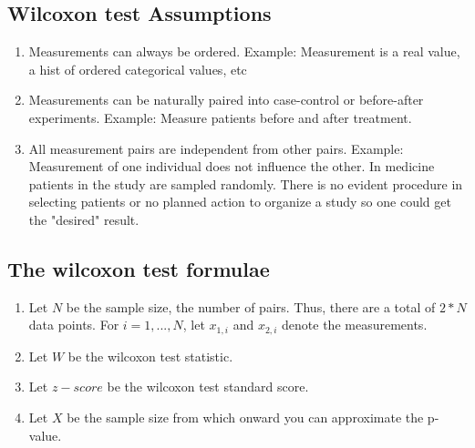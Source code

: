 \documentclass[12pt]{article}
\begin{document}
\subsection{Wilcoxon test Assumptions}

\begin{enumerate}
  \item Measurements can always be ordered. Example: Measurement is a real value, a hist of ordered categorical values, etc
  \item Measurements can be naturally paired into case-control or before-after experiments. Example: Measure patients before and after treatment.
  \item All measurement pairs are independent from other pairs. Example: Measurement of one individual does not influence the other. In medicine patients in the study are sampled randomly. There is no evident procedure in selecting patients or no planned action to organize a study so one could get the "desired" result.
\end{enumerate}

\subsection{The wilcoxon test formulae}
\begin{enumerate}
\item Let $N$ be the sample size, the number of pairs. Thus, there are a total of $2*N$ data points. For $i=1,...,N$, let $x_{1, i}$ and $x_{2, i}$ denote the measurements.
\item Let $W$ be the wilcoxon test statistic.
\item Let $z-score$ be the wilcoxon test standard score.
\item Let $X$ be the sample size from which onward you can approximate the p-value.
\end{enumerate}
\end{document}
